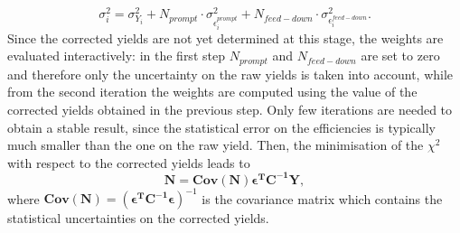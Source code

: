 \documentclass[b5paper,10pt,twoside,oldstyle,classica]{toptesi}
\begin{document}
\begin{equation}
 \sigma_i^2 = \sigma_{Y_i}^2 + N_{prompt}\cdot\sigma^2_{\epsilon_i^{prompt}} + N_{feed-down}\cdot\sigma^2_{\epsilon_i^{feed-down}}.
\end{equation}
Since the corrected yields are not yet determined at this stage, the weights are evaluated interactively: in the first step $N_{prompt}$ and $N_{feed-down}$ are set to zero and therefore only the uncertainty on the raw yields is taken into account, while from the second iteration the weights are computed using the value of the corrected yields obtained in the previous step. Only few iterations are needed to obtain a stable result, since the statistical error on the efficiencies is typically much smaller than the one on the raw yield.
Then, the minimisation of the $\chi^2$ with respect to the corrected yields leads to 
\begin{equation}
 \pmb{N} = \pmb{Cov(N)}\pmb{\epsilon^T C^{-1} Y}, 
\end{equation}
where $\pmb{Cov(N)} = (\pmb{\epsilon^T C^{-1} \epsilon})^{-1}$ is the covariance matrix which contains the statistical uncertainties on the corrected yields.
\end{document}
